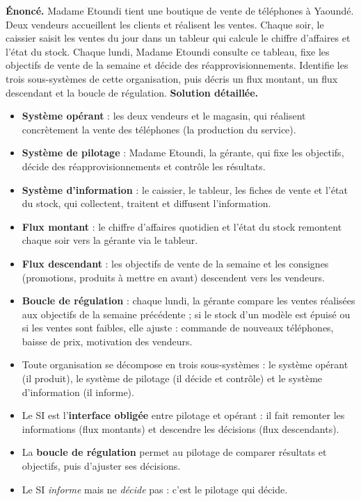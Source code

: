 \documentclass[11pt]{article}
\newcommand{\cle}[1]{{\popxbold\color{popdark}#1}}
\begin{document}
\begin{exoresolu}
\textbf{Énoncé.} Madame Etoundi tient une boutique de vente de téléphones à Yaoundé. Deux vendeurs accueillent les clients et réalisent les ventes. Chaque soir, le caissier saisit les ventes du jour dans un tableur qui calcule le chiffre d'affaires et l'état du stock. Chaque lundi, Madame Etoundi consulte ce tableau, fixe les objectifs de vente de la semaine et décide des réapprovisionnements. Identifie les trois sous-systèmes de cette organisation, puis décris un flux montant, un flux descendant et la boucle de régulation.
\tcblower
\textbf{Solution détaillée.}
\begin{itemize}
\item \textbf{Système opérant} : les deux vendeurs et le magasin, qui réalisent concrètement la vente des téléphones (la production du service).
\item \textbf{Système de pilotage} : Madame Etoundi, la gérante, qui fixe les objectifs, décide des réapprovisionnements et contrôle les résultats.
\item \textbf{Système d'information} : le caissier, le tableur, les fiches de vente et l'état du stock, qui collectent, traitent et diffusent l'information.
\item \textbf{Flux montant} : le chiffre d'affaires quotidien et l'état du stock remontent chaque soir vers la gérante via le tableur.
\item \textbf{Flux descendant} : les objectifs de vente de la semaine et les consignes (promotions, produits à mettre en avant) descendent vers les vendeurs.
\item \textbf{Boucle de régulation} : chaque lundi, la gérante compare les ventes réalisées aux objectifs de la semaine précédente ; si le stock d'un modèle est épuisé ou si les ventes sont faibles, elle ajuste : commande de nouveaux téléphones, baisse de prix, motivation des vendeurs.
\end{itemize}
\end{exoresolu}

\begin{aretenir}
\begin{itemize}
\item Toute organisation se décompose en trois sous-systèmes : le \cle{système opérant} (il produit), le \cle{système de pilotage} (il décide et contrôle) et le \cle{système d'information} (il informe).
\item Le SI est l'\textbf{interface obligée} entre pilotage et opérant : il fait remonter les informations (flux montants) et descendre les décisions (flux descendants).
\item La \textbf{boucle de régulation} permet au pilotage de comparer résultats et objectifs, puis d'ajuster ses décisions.
\item Le SI \emph{informe} mais ne \emph{décide} pas : c'est le pilotage qui décide.
\end{itemize}
\end{aretenir}
\end{document}
